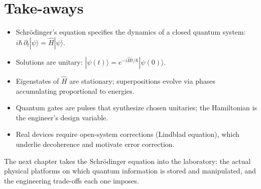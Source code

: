 \section{Take-aways}

\begin{itemize}
  \item Schr\"odinger's equation specifies the dynamics of a closed quantum system: $i\hbar\,\partial_t|\psi\rangle = \hat H|\psi\rangle$.
  \item Solutions are unitary: $|\psi(t)\rangle = e^{-i\hat H t/\hbar}|\psi(0)\rangle$.
  \item Eigenstates of $\hat H$ are stationary; superpositions evolve via phases accumulating proportional to energies.
  \item Quantum gates are pulses that synthesize chosen unitaries; the Hamiltonian is the engineer's design variable.
  \item Real devices require open-system corrections (Lindblad equation), which underlie decoherence and motivate error correction.
\end{itemize}

The next chapter takes the Schr\"odinger equation into the laboratory: the actual physical platforms on which quantum information is stored and manipulated, and the engineering trade-offs each one imposes.

\textsep
